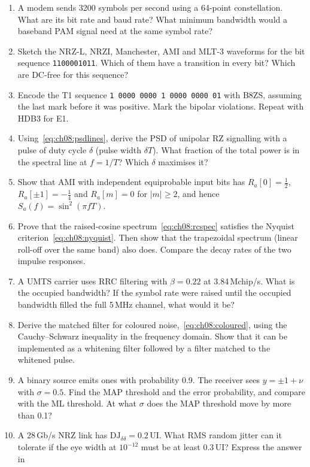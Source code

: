 \problems
\begin{enumerate}[label=\thechapter.\arabic*]
\item A modem sends 3200 symbols per second using a 64-point constellation. What are its bit
rate and baud rate? What minimum bandwidth would a baseband PAM signal need at the same symbol
rate?
\item Sketch the NRZ-L, NRZI, Manchester, AMI and MLT-3 waveforms for the bit sequence
\texttt{1100001011}. Which of them have a transition in every bit? Which are DC-free for this
sequence?
\item Encode the T1 sequence \texttt{1 0000 0000 1 0000 0000 01} with B8ZS, assuming the last
mark before it was positive. Mark the bipolar violations. Repeat with HDB3 for E1.
\item Using~\eqref{eq:ch08:psdlines}, derive the PSD of unipolar RZ signalling with a pulse of
duty cycle $\delta$ (pulse width $\delta T$). What fraction of the total power is in the
spectral line at $f=1/T$? Which $\delta$ maximises it?
\item Show that AMI with independent equiprobable input bits has $R_a[0]=\tfrac12$,
$R_a[\pm1]=-\tfrac14$ and $R_a[m]=0$ for $|m|\ge2$, and hence $S_a(f)=\sin^2(\pi fT)$.
\item Prove that the raised-cosine spectrum~\eqref{eq:ch08:rcspec} satisfies the Nyquist
criterion~\eqref{eq:ch08:nyquist}. Then show that the trapezoidal spectrum (linear roll-off
over the same band) also does. Compare the decay rates of the two impulse responses.
\item A UMTS carrier uses RRC filtering with $\beta=0.22$ at 3.84\,Mchip/s. What is the
occupied bandwidth? If the symbol rate were raised until the occupied bandwidth filled the full
5\,MHz channel, what would it be?
\item Derive the matched filter for coloured noise,~\eqref{eq:ch08:coloured}, using the
Cauchy--Schwarz inequality in the frequency domain. Show that it can be implemented as a whitening
filter followed by a filter matched to the whitened pulse.
\item A binary source emits ones with probability 0.9. The receiver sees $y=\pm1+\nu$ with
$\sigma=0.5$. Find the MAP threshold and the error probability, and compare with the ML
threshold. At what $\sigma$ does the MAP threshold move by more than 0.1?
\item A 28\,Gb/s NRZ link has $\mathrm{DJ}_{\delta\delta}=0.2$\,UI. What RMS random jitter can it
tolerate if the eye width at $10^{-12}$ must be at least 0.3\,UI? Express the answer in

\end{enumerate}
